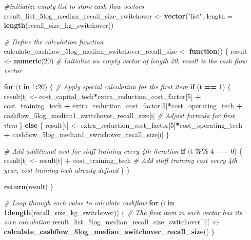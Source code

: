 \documentclass[
]{article}
\newenvironment{Shaded}{\begin{snugshade}}{\end{snugshade}}
\newcommand{\AttributeTok}[1]{\textcolor[rgb]{0.13,0.29,0.53}{#1}}
\newcommand{\CommentTok}[1]{\textcolor[rgb]{0.56,0.35,0.01}{\textit{#1}}}
\newcommand{\ControlFlowTok}[1]{\textcolor[rgb]{0.13,0.29,0.53}{\textbf{#1}}}
\newcommand{\DecValTok}[1]{\textcolor[rgb]{0.00,0.00,0.81}{#1}}
\newcommand{\FunctionTok}[1]{\textcolor[rgb]{0.13,0.29,0.53}{\textbf{#1}}}
\newcommand{\NormalTok}[1]{#1}
\newcommand{\OtherTok}[1]{\textcolor[rgb]{0.56,0.35,0.01}{#1}}
\newcommand{\SpecialCharTok}[1]{\textcolor[rgb]{0.81,0.36,0.00}{\textbf{#1}}}
\newcommand{\StringTok}[1]{\textcolor[rgb]{0.31,0.60,0.02}{#1}}
\begin{document}
\begin{Shaded}
\begin{Highlighting}[]
\CommentTok{\#initialize empty list to store cash flow vectors}
\NormalTok{result\_list\_5log\_median\_recall\_size\_switchover }\OtherTok{\textless{}{-}} \FunctionTok{vector}\NormalTok{(}\StringTok{"list"}\NormalTok{, }\AttributeTok{length =} \FunctionTok{length}\NormalTok{(recall\_size\_kg\_switchover))}


\CommentTok{\# Define the calculation function}
\NormalTok{calculate\_cashflow\_5log\_median\_switchover\_recall\_size }\OtherTok{\textless{}{-}} \ControlFlowTok{function}\NormalTok{() \{}
\NormalTok{  result }\OtherTok{\textless{}{-}} \FunctionTok{numeric}\NormalTok{(}\DecValTok{20}\NormalTok{)  }\CommentTok{\# Initialize an empty vector of length 20, result is the cash flow vector}
  
  \ControlFlowTok{for}\NormalTok{ (t }\ControlFlowTok{in} \DecValTok{1}\SpecialCharTok{:}\DecValTok{20}\NormalTok{) \{}
    \CommentTok{\# Apply special calculation for the first item}
    \ControlFlowTok{if}\NormalTok{ (t }\SpecialCharTok{==} \DecValTok{1}\NormalTok{) \{}
\NormalTok{      result[t] }\OtherTok{\textless{}{-}}\NormalTok{ cost\_capital\_tech}\SpecialCharTok{*}\NormalTok{extra\_reduction\_cost\_factor[}\DecValTok{5}\NormalTok{] }\SpecialCharTok{+}\NormalTok{ cost\_training\_tech }\SpecialCharTok{+}\NormalTok{ extra\_reduction\_cost\_factor[}\DecValTok{5}\NormalTok{]}\SpecialCharTok{*}\NormalTok{cost\_operating\_tech }\SpecialCharTok{+}\NormalTok{ cashflow\_5log\_median1\_switchover\_recall\_size[i] }\CommentTok{\# Adjust formula for first item}
\NormalTok{    \} }\ControlFlowTok{else}\NormalTok{ \{}
\NormalTok{      result[t] }\OtherTok{\textless{}{-}}\NormalTok{ extra\_reduction\_cost\_factor[}\DecValTok{5}\NormalTok{]}\SpecialCharTok{*}\NormalTok{cost\_operating\_tech }\SpecialCharTok{+}\NormalTok{ cashflow\_5log\_median1\_switchover\_recall\_size[i]}
\NormalTok{    \}}
    
    \CommentTok{\# Add additional cost for staff training every 4th iteration}
    \ControlFlowTok{if}\NormalTok{ (t }\SpecialCharTok{\%\%} \DecValTok{4} \SpecialCharTok{==} \DecValTok{0}\NormalTok{) \{}
\NormalTok{      result[t] }\OtherTok{\textless{}{-}}\NormalTok{ result[t] }\SpecialCharTok{+}\NormalTok{ cost\_training\_tech  }\CommentTok{\# Add staff training cost every 4th year, cost training tech already defined}
\NormalTok{    \}}
\NormalTok{  \}}
  
  \FunctionTok{return}\NormalTok{(result)}
\NormalTok{\}}

\CommentTok{\# Loop through each value to calculate cashflow}
\ControlFlowTok{for}\NormalTok{ (i }\ControlFlowTok{in} \DecValTok{1}\SpecialCharTok{:}\FunctionTok{length}\NormalTok{(recall\_size\_kg\_switchover)) \{}
  \CommentTok{\# The first item in each vector has its own calculation}
\NormalTok{  result\_list\_5log\_median\_recall\_size\_switchover[[i]] }\OtherTok{\textless{}{-}} \FunctionTok{calculate\_cashflow\_5log\_median\_switchover\_recall\_size}\NormalTok{()}
\NormalTok{\}}




\end{Highlighting}
\end{Shaded}
\end{document}
